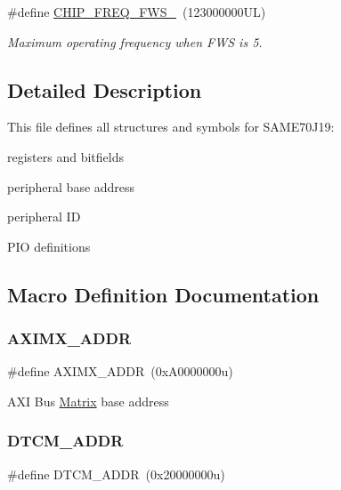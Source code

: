 \begin{DoxyCompactItemize}
\mbox{\label{group__SAME70J19__definitions_ga3b66824f858591135877b369f98d48a5}} 
\#define \mbox{\hyperlink{group__SAME70J19__definitions_ga3b66824f858591135877b369f98d48a5}{C\+H\+I\+P\+\_\+\+F\+R\+E\+Q\+\_\+\+F\+W\+S\+\_}}~(123000000\+U\+L)
\begin{DoxyCompactList}\small\item\em Maximum operating frequency when F\+WS is 5. \end{DoxyCompactList}\end{DoxyCompactItemize}


\subsection{Detailed Description}
This file defines all structures and symbols for S\+A\+M\+E70\+J19\+:
\begin{DoxyItemize}
\item registers and bitfields
\item peripheral base address
\item peripheral ID
\item P\+IO definitions 
\end{DoxyItemize}

\subsection{Macro Definition Documentation}
\mbox{\label{group__SAME70J19__definitions_ga2fb7cc681bf5e7fbce5e3635b72a330a}} 
\subsubsection{\texorpdfstring{AXIMX\_ADDR}{AXIMX\_ADDR}}
{\footnotesize\ttfamily \#define A\+X\+I\+M\+X\+\_\+\+A\+D\+DR~(0x\+A0000000u)}

A\+XI Bus \mbox{\hyperlink{structMatrix}{Matrix}} base address \mbox{\label{group__SAME70J19__definitions_ga26626a425f7ebb3a0c2dbc276f0d9f78}} 
\subsubsection{\texorpdfstring{DTCM\_ADDR}{DTCM\_ADDR}}
{\footnotesize\ttfamily \#define D\+T\+C\+M\+\_\+\+A\+D\+DR~(0x20000000u)}

